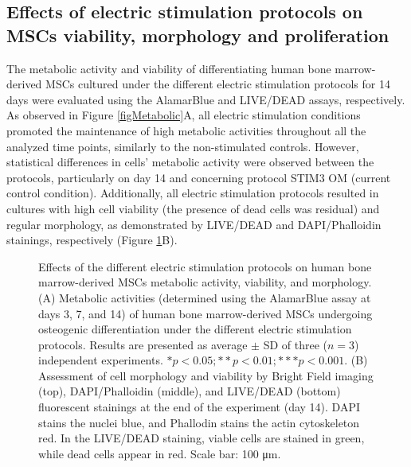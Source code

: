 \subsection{Effects of electric stimulation protocols on \ac{MSCs} viability, morphology and proliferation}
The metabolic activity and viability of differentiating human bone marrow-derived \ac{MSCs} cultured under the different electric stimulation protocols for 14 days were evaluated using the AlamarBlue and LIVE/DEAD assays, respectively. As observed in Figure \ref{figMetabolic}A, all electric stimulation conditions promoted the maintenance of high metabolic activities throughout all the analyzed time points, similarly to the non-stimulated controls. However, statistical differences in cells’ metabolic activity were observed between the protocols, particularly on day 14 and concerning protocol STIM3 OM (current control condition). Additionally, all electric stimulation protocols resulted in cultures with high cell viability (the presence of dead cells was residual) and regular morphology, as demonstrated by LIVE/DEAD and DAPI/Phalloidin stainings, respectively (Figure \ref{fig4d7}B). 


\begin{figure}
\caption{Effects of the different electric stimulation protocols on human bone marrow-derived \ac{MSCs} metabolic activity, viability, and morphology. (A) Metabolic activities (determined using the AlamarBlue assay at days 3, 7, and 14) of human bone marrow-derived \ac{MSCs} undergoing osteogenic differentiation under the different electric stimulation protocols. Results are presented as average $\pm$ SD of three ($n=3$) independent experiments. $*p < 0.05; **p < 0.01; ***p < 0.001$. (B) Assessment of cell morphology and viability by Bright Field imaging (top), DAPI/Phalloidin (middle), and LIVE/DEAD (bottom) fluorescent stainings at the end of the experiment (day 14). DAPI stains the nuclei blue, and Phallodin stains the actin cytoskeleton red. In the LIVE/DEAD staining, viable cells are stained in green, while dead cells appear in red. Scale bar: 100 \si{\micro\meter}.}
\label{fig4d7}
\end{figure}
 

